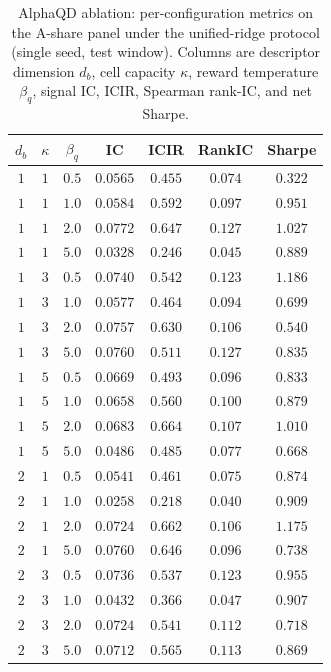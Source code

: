 \begin{table}[!htb]
\centering
\caption[Full AlphaQD ablation grid.]{AlphaQD ablation: per-configuration metrics on the A-share panel under the unified-ridge protocol (single seed, test window). Columns are descriptor dimension $d_b$, cell capacity $\kappa$, reward temperature $\beta_q$, signal IC, ICIR, Spearman rank-IC, and net Sharpe.}
\label{tab:app_ablation_full}
\renewcommand{\arraystretch}{1.05}
\footnotesize
\begin{tabular}{ccccccc}
\toprule
$d_b$ & $\kappa$ & $\beta_q$ & IC & ICIR & RankIC & Sharpe \\
\midrule
$1$ & $1$ & $0.5$ & $0.0565$ & $0.455$ & $0.074$ & $0.322$ \\
$1$ & $1$ & $1.0$ & $0.0584$ & $0.592$ & $0.097$ & $0.951$ \\
$1$ & $1$ & $2.0$ & $0.0772$ & $0.647$ & $0.127$ & $1.027$ \\
$1$ & $1$ & $5.0$ & $0.0328$ & $0.246$ & $0.045$ & $0.889$ \\
$1$ & $3$ & $0.5$ & $0.0740$ & $0.542$ & $0.123$ & $1.186$ \\
$1$ & $3$ & $1.0$ & $0.0577$ & $0.464$ & $0.094$ & $0.699$ \\
$1$ & $3$ & $2.0$ & $0.0757$ & $0.630$ & $0.106$ & $0.540$ \\
$1$ & $3$ & $5.0$ & $0.0760$ & $0.511$ & $0.127$ & $0.835$ \\
$1$ & $5$ & $0.5$ & $0.0669$ & $0.493$ & $0.096$ & $0.833$ \\
$1$ & $5$ & $1.0$ & $0.0658$ & $0.560$ & $0.100$ & $0.879$ \\
$1$ & $5$ & $2.0$ & $0.0683$ & $0.664$ & $0.107$ & $1.010$ \\
$1$ & $5$ & $5.0$ & $0.0486$ & $0.485$ & $0.077$ & $0.668$ \\
\midrule
$2$ & $1$ & $0.5$ & $0.0541$ & $0.461$ & $0.075$ & $0.874$ \\
$2$ & $1$ & $1.0$ & $0.0258$ & $0.218$ & $0.040$ & $0.909$ \\
$2$ & $1$ & $2.0$ & $0.0724$ & $0.662$ & $0.106$ & $1.175$ \\
$2$ & $1$ & $5.0$ & $0.0760$ & $0.646$ & $0.096$ & $0.738$ \\
$2$ & $3$ & $0.5$ & $0.0736$ & $0.537$ & $0.123$ & $0.955$ \\
$2$ & $3$ & $1.0$ & $0.0432$ & $0.366$ & $0.047$ & $0.907$ \\
$2$ & $3$ & $2.0$ & $0.0724$ & $0.541$ & $0.112$ & $0.718$ \\
$2$ & $3$ & $5.0$ & $0.0712$ & $0.565$ & $0.113$ & $0.869$ \\

\end{tabular}
\end{table}
